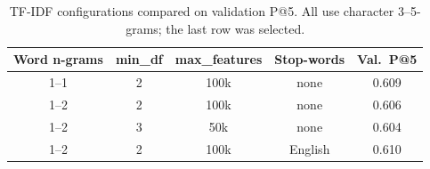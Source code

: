 \begin{table}[H]
  \centering\small
  \caption{TF-IDF configurations compared on validation P@5. All use character 3--5-grams; the last row was selected.}
  \label{tab:grid}
  \begin{tabular}{|c|c|c|c|c|}
    \hline
    \textbf{Word n-grams} & \textbf{min\_df} & \textbf{max\_features} & \textbf{Stop-words} & \textbf{Val.\ P@5} \\
    \hline
    1--1 & 2 & 100k & none    & 0.609 \\
    \hline
    1--2 & 2 & 100k & none    & 0.606 \\
    \hline
    1--2 & 3 & 50k  & none    & 0.604 \\
    \hline
    1--2 & 2 & 100k & English & 0.610 \\
    \hline
  \end{tabular}
\end{table}
